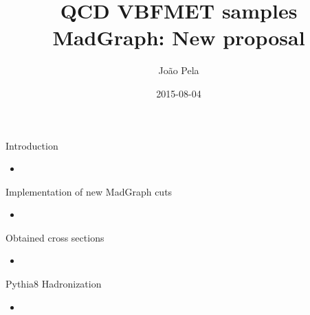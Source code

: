 \documentclass[8pt]{beamer}
\author[J. Pela]{João Pela}
\title{QCD VBFMET samples MadGraph: New proposal}
\institute[ICL]{Imperial College London}
\date{2015-08-04}
\begin{document}
\setlength{\unitlength}{1mm}

\begin{frame}
  \titlepage
\end{frame}

\begin{frame}{Introduction}

\begin{block}{}
  
\begin{itemize}
  \item 
\end{itemize}

\end{block}

\end{frame}


\begin{frame}{Implementation of new MadGraph cuts}

\begin{block}{}
  
\begin{itemize}
  \item 
\end{itemize}

\end{block}

\end{frame}

\begin{frame}{Obtained cross sections}

\begin{block}{}
  
\begin{itemize}
  \item 
\end{itemize}

\end{block}

\end{frame}

\begin{frame}{Pythia8 Hadronization}

\begin{block}{}
  
\begin{itemize}
  \item 
\end{itemize}

\end{block}

\end{frame}
\end{document}
